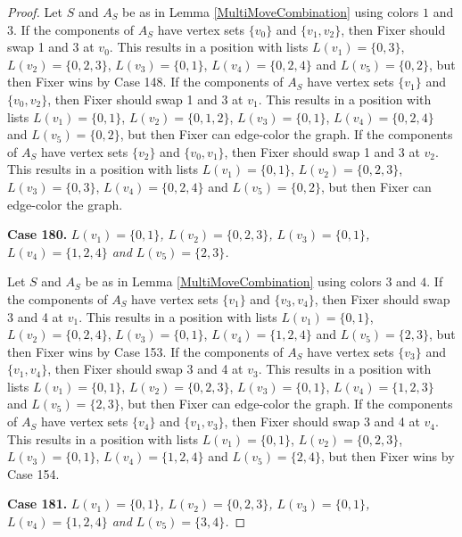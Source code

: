 \documentclass[12pt]{amsart}
\theoremstyle{plain}
\theoremstyle{definition}
\theoremstyle{remark}
\begin{document}
\begin{proof}
Let $S$ and $A_S$ be as in Lemma \ref{MultiMoveCombination} using colors $1$ and $3$. If the components of $A_S$ have vertex sets $\{v_0\}$ and $\{v_1, v_2\}$, then Fixer should swap 1 and 3 at $v_0$. This results in a position with lists $L(v_1) = \{0, 3\}$, $L(v_2) = \{0, 2, 3\}$, $L(v_3) = \{0, 1\}$, $L(v_4) = \{0, 2, 4\}$ and $L(v_5) = \{0, 2\}$, but then Fixer wins by Case 148.
If the components of $A_S$ have vertex sets $\{v_1\}$ and $\{v_0, v_2\}$, then Fixer should swap 1 and 3 at $v_1$. This results in a position with lists $L(v_1) = \{0, 1\}$, $L(v_2) = \{0, 1, 2\}$, $L(v_3) = \{0, 1\}$, $L(v_4) = \{0, 2, 4\}$ and $L(v_5) = \{0, 2\}$, but then Fixer can edge-color the graph.
If the components of $A_S$ have vertex sets $\{v_2\}$ and $\{v_0, v_1\}$, then Fixer should swap 1 and 3 at $v_2$. This results in a position with lists $L(v_1) = \{0, 1\}$, $L(v_2) = \{0, 2, 3\}$, $L(v_3) = \{0, 3\}$, $L(v_4) = \{0, 2, 4\}$ and $L(v_5) = \{0, 2\}$, but then Fixer can edge-color the graph.

\noindent\textbf{Case 180.  }\textit{$L(v_1) = \{0, 1\}$, $L(v_2) = \{0, 2, 3\}$, $L(v_3) = \{0, 1\}$, $L(v_4) = \{1, 2, 4\}$ and $L(v_5) = \{2, 3\}$.}

Let $S$ and $A_S$ be as in Lemma \ref{MultiMoveCombination} using colors $3$ and $4$. If the components of $A_S$ have vertex sets $\{v_1\}$ and $\{v_3, v_4\}$, then Fixer should swap 3 and 4 at $v_1$. This results in a position with lists $L(v_1) = \{0, 1\}$, $L(v_2) = \{0, 2, 4\}$, $L(v_3) = \{0, 1\}$, $L(v_4) = \{1, 2, 4\}$ and $L(v_5) = \{2, 3\}$, but then Fixer wins by Case 153.
If the components of $A_S$ have vertex sets $\{v_3\}$ and $\{v_1, v_4\}$, then Fixer should swap 3 and 4 at $v_3$. This results in a position with lists $L(v_1) = \{0, 1\}$, $L(v_2) = \{0, 2, 3\}$, $L(v_3) = \{0, 1\}$, $L(v_4) = \{1, 2, 3\}$ and $L(v_5) = \{2, 3\}$, but then Fixer can edge-color the graph.
If the components of $A_S$ have vertex sets $\{v_4\}$ and $\{v_1, v_3\}$, then Fixer should swap 3 and 4 at $v_4$. This results in a position with lists $L(v_1) = \{0, 1\}$, $L(v_2) = \{0, 2, 3\}$, $L(v_3) = \{0, 1\}$, $L(v_4) = \{1, 2, 4\}$ and $L(v_5) = \{2, 4\}$, but then Fixer wins by Case 154.

\noindent\textbf{Case 181.  }\textit{$L(v_1) = \{0, 1\}$, $L(v_2) = \{0, 2, 3\}$, $L(v_3) = \{0, 1\}$, $L(v_4) = \{1, 2, 4\}$ and $L(v_5) = \{3, 4\}$.}


\end{proof}
\end{document}
